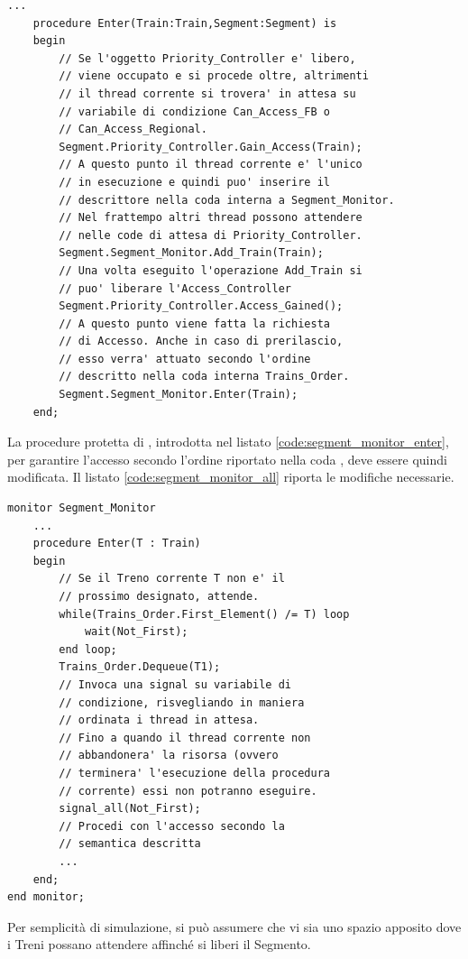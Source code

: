 \begin{description}
\begin{lstlisting}[label=code:segment_enter_procedure,caption=\small{Esempio di procedura \ttt{Enter} che realizza il protocollo di accesso.}]
	...
	procedure Enter(Train:Train,Segment:Segment) is
	begin
		// Se l'oggetto Priority_Controller e' libero, 
		// viene occupato e si procede oltre, altrimenti 
		// il thread corrente si trovera' in attesa su  
		// variabile di condizione Can_Access_FB o 
		// Can_Access_Regional.
		Segment.Priority_Controller.Gain_Access(Train);
		// A questo punto il thread corrente e' l'unico  
		// in esecuzione e quindi puo' inserire il  
		// descrittore nella coda interna a Segment_Monitor. 
		// Nel frattempo altri thread possono attendere
		// nelle code di attesa di Priority_Controller.
		Segment.Segment_Monitor.Add_Train(Train);
		// Una volta eseguito l'operazione Add_Train si 
		// puo' liberare l'Access_Controller
		Segment.Priority_Controller.Access_Gained();
		// A questo punto viene fatta la richiesta 
		// di Accesso. Anche in caso di prerilascio, 
		// esso verra' attuato secondo l'ordine 
		// descritto nella coda interna Trains_Order.
		Segment.Segment_Monitor.Enter(Train);
	end;
\end{lstlisting}

	La procedure protetta  di , introdotta nel listato \ref{code:segment_monitor_enter}, per garantire l'accesso secondo l'ordine riportato nella coda , deve essere quindi modificata. Il listato \ref{code:segment_monitor_all} riporta le modifiche necessarie.
	
\begin{lstlisting}[label=code:segment_monitor_all,caption=\small{Struttura della risorsa \ii{monitor} che regola l'accesso al Segmento.}]
monitor Segment_Monitor
	...
	procedure Enter(T : Train) 
	begin
		// Se il Treno corrente T non e' il
		// prossimo designato, attende.
		while(Trains_Order.First_Element() /= T) loop
			wait(Not_First);
		end loop;
		Trains_Order.Dequeue(T1);
		// Invoca una signal su variabile di 
		// condizione, risvegliando in maniera
		// ordinata i thread in attesa.
		// Fino a quando il thread corrente non
		// abbandonera' la risorsa (ovvero 
		// terminera' l'esecuzione della procedura
		// corrente) essi non potranno eseguire.
		signal_all(Not_First);
		// Procedi con l'accesso secondo la 
		// semantica descritta
		...
	end;
end monitor;	
\end{lstlisting}
			
		Per semplicità di simulazione, si può assumere che vi sia uno spazio apposito dove i Treni possano attendere affinché si liberi il Segmento.
			  

\end{description}
